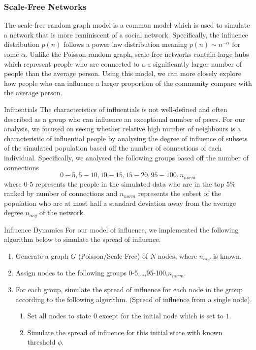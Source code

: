 \documentclass[10pt, oneside, reqno]{amsart}
\makeatletter
\theoremstyle{plain}%
\theoremstyle{definition}
\theoremstyle{remark}
\renewcommand\subsection{\@startsection{subsection}{2}%
  \z@{.5\linespacing\@plus.7\linespacing}{-.5em}%
  {\normalfont\scshape}}
\makeatother
\begin{document}
\subsubsection{Scale-Free Networks}
The scale-free random graph model is a common model which is used to simulate a network that is more reminiscent of a social network. 
Specifically, the influence distribution $p(n)$ follows a power law distribution meaning $p(n) \sim n^{-\alpha}$ for some $\alpha$.
Unlike the Poisson random graph, scale-free networks contain large hubs which represent people who are connected to a a significantly larger number of people than the average person. 
Using this model, we can more closely explore how people who can influence a larger proportion of the community compare with the average person.


\subsection{Influentials}
The characteristics of influentials is not well-defined and often described as a group who can influence an exceptional number of peers.
For our analysis, we focused on seeing whether relative high number of neighbours is a characteristic of influential people by analysing the degree of influence of subsets of the simulated population based off the number of connections of each individual.
Specifically, we analysed the following groups based off the number of connections
\[ 0-5, 5-10, 10-15, 15-20, 95-100, n_{norm} \]
where 0-5 represents the people in the simulated data who are in the top $5\%$ ranked by number of connections and $n_{norm}$ represents the subset of the population who are at most half a standard deviation away from the average degree $n_{avg}$ of the network.




\subsection{Influence Dynamics}
For our model of influence, we implemented the following algorithm below to simulate the spread of influence\cite{github}.

\begin{enumerate}
    \item Generate a graph $G$ (Poisson/Scale-Free) of $N$ nodes, where $n_{avg}$ is known.
    \item Assign nodes to the following groups 0-5,\dots,95-100,$n_{norm}$.
    \item For each group, simulate the spread of influence for each node in the group according to the following algorithm. (Spread of influence from a single node).
    \begin{enumerate}
        \item Set all nodes to state $0$ except for the initial node which is set to $1$.
        \item Simulate the spread of influence for this initial state with known threshold $\phi$.
    \end{enumerate}
\end{enumerate}
\end{document}
